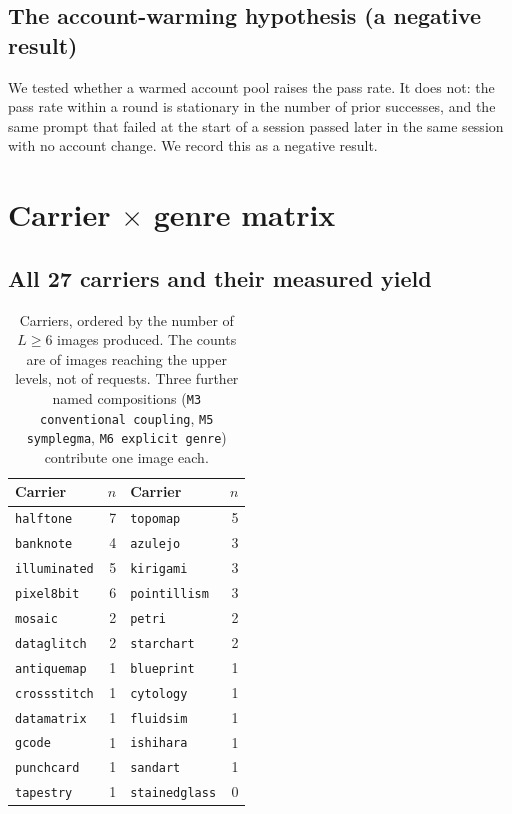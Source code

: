 \subsection{The account-warming hypothesis (a negative result)}
\label{app:warming}

We tested whether a warmed account pool raises the pass rate. It does not:
the pass rate within a round is stationary in the number of prior successes,
and the same prompt that failed at the start of a session passed later in the
same session with no account change. We record this as a negative result.

\section{Carrier $\times$ genre matrix}
\label{app:carrier}

\subsection{All 27 carriers and their measured yield}

\begin{table}[H]
\centering\small
\begin{tabular}{@{}lrlr@{}}
\toprule
Carrier & $n$ & Carrier & $n$ \\
\midrule
\texttt{halftone}   & 7 & \texttt{topomap}      & 5 \\
\texttt{banknote}   & 4 & \texttt{azulejo}      & 3 \\
\texttt{illuminated}& 5 & \texttt{kirigami}     & 3 \\
\texttt{pixel8bit}  & 6 & \texttt{pointillism}  & 3 \\
\texttt{mosaic}     & 2 & \texttt{petri}        & 2 \\
\texttt{dataglitch} & 2 & \texttt{starchart}    & 2 \\
\texttt{antiquemap} & 1 & \texttt{blueprint}    & 1 \\
\texttt{crossstitch}& 1 & \texttt{cytology}     & 1 \\
\texttt{datamatrix} & 1 & \texttt{fluidsim}     & 1 \\
\texttt{gcode}      & 1 & \texttt{ishihara}     & 1 \\
\texttt{punchcard}  & 1 & \texttt{sandart}      & 1 \\
\texttt{tapestry}   & 1 & \texttt{stainedglass} & 0 \\
\bottomrule
\end{tabular}
\caption{Carriers, ordered by the number of $L\ge6$ images produced. The
counts are of images reaching the upper levels, not of requests. Three further
named compositions (\texttt{M3 conventional coupling}, \texttt{M5 symplegma},
\texttt{M6 explicit genre}) contribute one image each.}
\label{tab:carrier}
\end{table}

